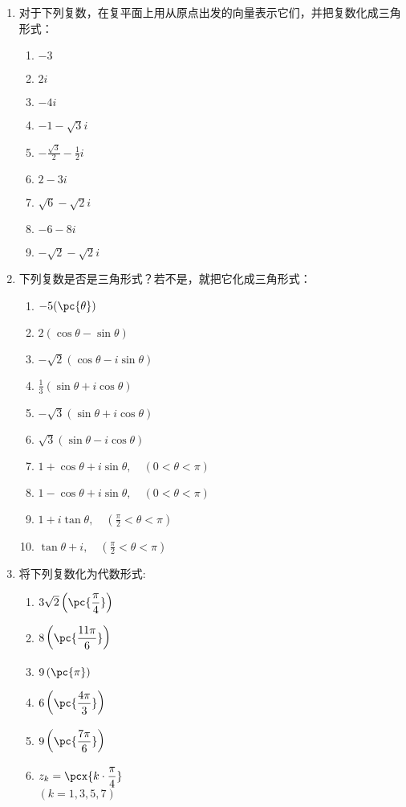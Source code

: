\begin{enumerate}
    \item 对于下列复数，在复平面上用从原点出发的向量表示它们，并把复数化成三角形式：
\begin{multicols}{3}
\begin{enumerate}[(1)]
    \item $-3$
    \item $2i$
    \item $-4i$
    \item $-1-\sqrt{3}i$
    \item $-\frac{\sqrt{3}}{2}-\frac{1}{2}i$
    \item $2-3i$
    \item $\sqrt{6}-\sqrt{2}i$
    \item $-6-8i$
    \item $-\sqrt{2}-\sqrt{2}i$
\end{enumerate}
\end{multicols}
    \item 下列复数是否是三角形式？若不是，就把它化成三角形式：
\begin{multicols}{2}
\begin{enumerate}[(1)]
    \item $-5(\pc{\theta})$
    \item $2(\cos\theta-\sin\theta)$
    \item $-\sqrt{2}(\cos\theta-i\sin\theta)$
    \item $\frac{1}{3}(\sin\theta+i\cos\theta)$
    \item $-\sqrt{3}(\sin\theta+i\cos\theta)$
    \item $\sqrt{3}(\sin\theta-i\cos\theta)$
    \item $1+\cos\theta+i\sin\theta,\quad (0<\theta<\pi)$
    \item $1-\cos\theta+i\sin\theta,\quad (0<\theta<\pi)$
    \item $1+i\tan\theta,\quad \left(\frac{\pi}{2}<\theta<\pi\right)$
    \item $\tan\theta+i,\quad \left(\frac{\pi}{2}<\theta<\pi\right)$
\end{enumerate}
\end{multicols}

\item 将下列复数化为代数形式:
\begin{multicols}{2}
\begin{enumerate}[(1)]
    \item $3\sqrt{2}\left(\pc{\frac{\pi}{4}}\right)$
    \item $8\left(\pc{\frac{11\pi}{6}}\right)$
    \item $9\left(\pc{\pi}\right)$
    \item $6\left(\pc{\frac{4\pi}{3}}\right)$
    \item $9\left(\pc{\frac{7\pi}{6}}\right)$
    \item $z_k= \pcx{k\cdot \frac{\pi}{4}}$\\
    $(k=1,3,5,7)$
\end{enumerate}
\end{multicols}
\end{enumerate}

